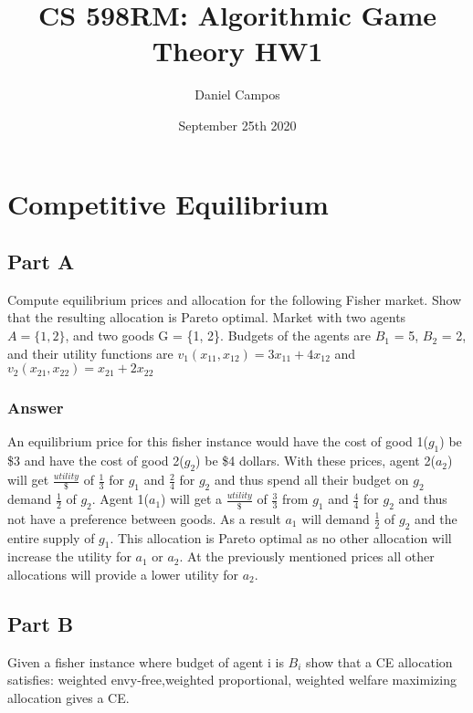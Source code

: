 \documentclass{article}
\title{CS 598RM: Algorithmic Game Theory HW1}
\author{Daniel Campos}
\date{September 25th  2020}
\begin{document}
\maketitle

\section{Competitive Equilibrium}
\subsection{Part A}
Compute equilibrium prices and allocation for the following Fisher market.
Show that the resulting allocation is Pareto optimal.
Market with two agents $A = \{1, 2\}$, and two goods G = \{1, 2\}. Budgets of the agents
are $B_1$ = 5, $B_2$ = 2, and their utility functions are $v_1(x_{11},x_{12})=3x_{11} +4x_{12}$ and $v_2(x_{21}, x_{22}) = x_{21} + 2x_{22}$
\subsubsection{Answer}
An equilibrium price for this fisher instance would have the cost of good 1($g_1$) be \$3 and have the cost of good 2($g_2$) be \$4 dollars. With these prices, agent 2($a_2$) will get $\frac{utility}{\$}$ of $\frac{1}{3}$ for $g_1$ and $\frac{2}{4}$ for $g_2$ and thus spend all their budget on $g_2$ demand $\frac{1}{2}$ of $g_2$. Agent 1($a_1$) will get a $\frac{utility}{\$}$ of $\frac{3}{3}$ from $g_1$ and $\frac{4}{4}$ for $g_2$ and thus not have a preference between goods. As a result $a_1$ will demand $\frac{1}{2}$ of $g_2$ and the entire supply of $g_1$. This allocation is Pareto optimal as no other allocation will increase the utility for $a_1$ or $a_2$. At the previously mentioned prices all other allocations will provide a lower utility for $a_2$.   
\subsection{Part B}
Given a fisher instance where budget of agent i is $B_i$ show that a 
CE allocation satisfies: weighted envy-free,weighted proportional, weighted welfare maximizing allocation gives a CE. 
\end{document}
